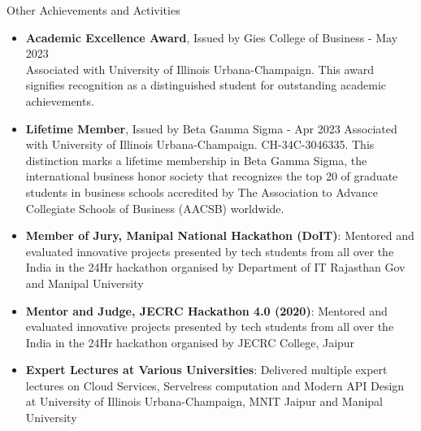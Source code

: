 \documentclass{resume} %
\begin{document}
    \begin{rSection}{Other Achievements and Activities}
        \begin{itemize}
            \item \textbf{Academic Excellence Award}, Issued by Gies College of Business - May 2023 \\
            Associated with University of Illinois Urbana-Champaign. This award signifies recognition as a distinguished student for outstanding academic achievements.
            \item \textbf{Lifetime Member}, Issued by Beta Gamma Sigma - Apr 2023 Associated with University of Illinois Urbana-Champaign. CH-34C-3046335. This distinction marks a lifetime membership in Beta Gamma Sigma, the international business honor society that recognizes the top 20 of graduate students in business schools accredited by The Association to Advance Collegiate Schools of Business (AACSB) worldwide.
            \item \textbf{Member of Jury, Manipal National Hackathon (DoIT)}: Mentored and evaluated innovative projects presented by tech students from all over the India in the 24Hr hackathon organised by Department of IT Rajasthan Gov and Manipal University
            \item \textbf{Mentor and Judge, JECRC Hackathon 4.0 (2020)}: Mentored and evaluated innovative projects presented by tech students from all over the India in the 24Hr hackathon organised by JECRC College, Jaipur
            \item \textbf{Expert Lectures at Various Universities}: Delivered multiple expert lectures on Cloud Services, Servelress computation and Modern API Design at University of Illinois Urbana-Champaign, MNIT Jaipur and Manipal University
        \end{itemize}
    \end{rSection}
    
\end{document}
